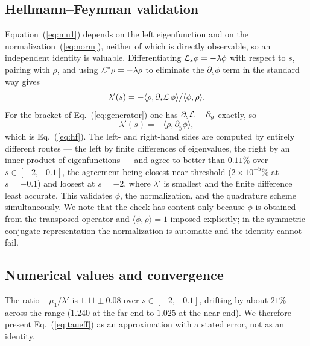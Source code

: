 \subsection{Hellmann--Feynman validation}

Equation~(\ref{eq:mu1}) depends on the left eigenfunction and on the normalization~(\ref{eq:norm}), neither of which is directly observable, so an independent identity is valuable.  Differentiating $\mathcal{L}_s\phi=-\lambda\phi$ with respect to $s$, pairing with $\rho$, and using $\mathcal{L}^\ast\rho=-\lambda\rho$ to eliminate the $\partial_s\phi$ term in the standard way gives
\begin{equation}
\lambda'(s)=-\langle\rho,\partial_s\mathcal{L}\,\phi\rangle/\langle\phi,\rho\rangle .
\end{equation}
For the bracket of Eq.~(\ref{eq:generator}) one has $\partial_s\mathcal{L}=\partial_y$ exactly, so
\begin{equation}
\lambda'(s)=-\langle\rho,\partial_y\phi\rangle,
\end{equation}
which is Eq.~(\ref{eq:hf}).  The left- and right-hand sides are computed by entirely different routes --- the left by finite differences of eigenvalues, the right by an inner product of eigenfunctions --- and agree to better than $0.11\%$ over $s\in[-2,-0.1]$, the agreement being closest near threshold ($2\times10^{-5}\%$ at $s=-0.1$) and loosest at $s=-2$, where $\lambda'$ is smallest and the finite difference least accurate.  This validates $\phi$, the normalization, and the quadrature scheme simultaneously.  We note that the check has content only because $\phi$ is obtained from the transposed operator and $\langle\phi,\rho\rangle=1$ imposed explicitly; in the symmetric conjugate representation the normalization is automatic and the identity cannot fail.

\subsection{Numerical values and convergence}

The ratio $-\mu_1/\lambda'$ is $1.11\pm0.08$ over $s\in[-2,-0.1]$, drifting by about $21\%$ across the range ($1.240$ at the far end to $1.025$ at the near end).  We therefore present Eq.~(\ref{eq:taueff}) as an approximation with a stated error, not as an identity.

